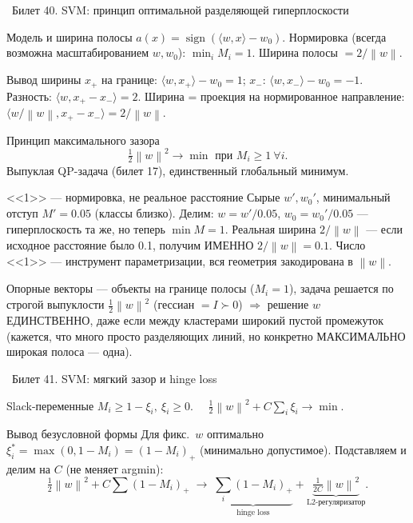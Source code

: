 \documentclass[12pt, a4paper]{article}
\newcommand{\bilet}[2]{%
  \vspace{10pt}%
  \noindent\colorbox{qcolor}{\parbox{\dimexpr\linewidth-2\fboxsep\relax}{%
    \color{white}\large\bfseries\strut\ Билет #1. #2%
  }}%
  \nopagebreak\vspace{5pt}\par\nopagebreak%
}
\newcommand{\sign}{\operatorname{sign}}
\newcommand{\norm}[1]{\left\lVert #1 \right\rVert}
\begin{document}
\bilet{40}{SVM: принцип оптимальной разделяющей гиперплоскости}

\begin{defbox}{Модель и ширина полосы}
$a(x)=\sign(\langle w,x\rangle-w_0)$. Нормировка (всегда возможна масштабированием $w,w_0$): $\min_i M_i=1$. Ширина полосы $=2/\norm{w}$.
\end{defbox}

\begin{proofbox}{Вывод ширины}
$x_+$ на границе: $\langle w,x_+\rangle-w_0=1$; $x_-$: $\langle w,x_-\rangle-w_0=-1$. Разность: $\langle w,x_+-x_-\rangle=2$. Ширина = проекция на нормированное направление: $\langle w/\norm{w}, x_+-x_-\rangle = 2/\norm{w}$.
\end{proofbox}

\begin{thmbox}{Принцип максимального зазора}
\[
  \tfrac12\norm{w}^2 \to \min \text{ при } M_i\ge1\ \forall i.
\]
Выпуклая QP-задача (билет 17), единственный глобальный минимум.
\end{thmbox}

\begin{exbox}{<<1>> --- нормировка, не реальное расстояние}
Сырые $w',w_0'$, минимальный отступ $M'=0.05$ (классы близко). Делим: $w=w'/0.05$, $w_0=w_0'/0.05$ --- гиперплоскость та же, но теперь $\min M=1$. Реальная ширина $2/\norm{w}$ --- если исходное расстояние было 0.1, получим ИМЕННО $2/\norm{w}=0.1$. Число <<1>> --- инструмент параметризации, вся геометрия закодирована в $\norm{w}$.
\end{exbox}

\begin{fishkabox}
Опорные векторы --- объекты на границе полосы ($M_i=1$), задача решается по строгой выпуклости $\tfrac12\norm{w}^2$ (гессиан $=I\succ0$) $\Rightarrow$ решение $w$ ЕДИНСТВЕННО, даже если между кластерами широкий пустой промежуток (кажется, что много просто разделяющих линий, но конкретно МАКСИМАЛЬНО широкая полоса --- одна).
\end{fishkabox}

\bilet{41}{SVM: мягкий зазор и hinge loss}

\begin{defbox}{Slack-переменные}
$M_i\ge1-\xi_i,\ \xi_i\ge0$. $\quad\tfrac12\norm{w}^2+C\sum_i\xi_i\to\min$.
\end{defbox}

\begin{proofbox}{Вывод безусловной формы}
Для фикс.\ $w$ оптимально $\xi_i^*=\max(0,1-M_i)=(1-M_i)_+$ (минимально допустимое). Подставляем и делим на $C$ (не меняет argmin):
\[
  \tfrac12\norm{w}^2+C\sum(1-M_i)_+ \;\to\; \underbrace{\sum_i(1-M_i)_+}_{\text{hinge loss}} + \underbrace{\tfrac{1}{2C}\norm{w}^2}_{\text{L2-регуляризатор}}.
\]
\end{proofbox}
\end{document}

